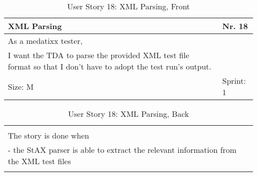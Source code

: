 \begin{table}[H]
  \caption{User Story 18: XML Parsing, Front}
  \label{Story_18_Front}
  \centering
  \begin{tabular}{|p{9cm} p{2cm}|}
	\hline  	
  	XML Parsing & Nr. 18 \\ 
  	\hline
  	As a medatixx tester, &    \\ 
  	I want the TDA to parse the provided XML test file format so that I don't have to adopt the test run's output.  &    \\ 
  	Size: M & Sprint: 1 \\ 
  	\hline
  \end{tabular}
\end{table}
\begin{table}[H]
  \caption{User Story 18: XML Parsing, Back}
  \label{Story_18_Back}
  \centering
  \begin{tabular}{|p{10cm} p{1cm}|}
  \hline
  	  &    \\ 
  	The story is done when &    \\ 
  	 - the StAX parser is able to extract the relevant information from the XML test files & \\ 
  	 
  	  &  
  	   \\ 
  	\hline
  \end{tabular}
\end{table}

\ \\ 


